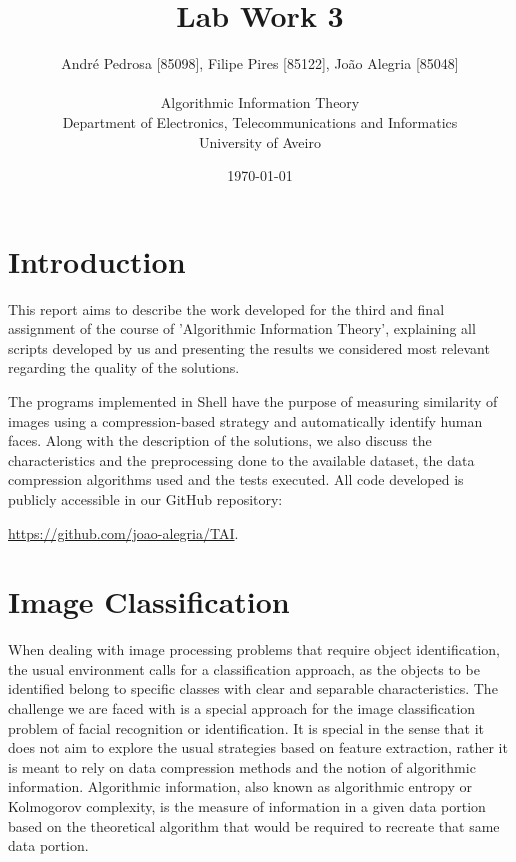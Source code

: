 \documentclass[12pt]{article}
\title{Lab Work 3}
\author
{André Pedrosa [85098], Filipe Pires [85122], João Alegria [85048]\\
\\
Algorithmic Information Theory\\
\normalsize{Department of Electronics, Telecommunications and Informatics}\\
\normalsize{University of Aveiro}\\
}
\date{\today{}}
\begin{document}
 

\baselineskip18pt

\maketitle 

\section{Introduction} %

This report aims to describe the work developed for the third and final assignment of the course of 'Algorithmic Information Theory', explaining all scripts
developed by us and presenting the results we considered most relevant regarding the quality of the solutions. 

The programs implemented in Shell have the purpose of measuring similarity of images using a compression-based strategy and automatically identify human faces.
Along with the description of the solutions, we also discuss the characteristics and the preprocessing done to the available dataset, the data compression 
algorithms used and the tests executed.
All code developed is publicly accessible in our GitHub repository: 

\url{https://github.com/joao-alegria/TAI}.
\newpage

\section{Image Classification} %

When dealing with image processing problems that require object identification, the usual environment calls for a classification approach, as the objects to 
be identified belong to specific classes with clear and separable characteristics.
The challenge we are faced with \cite{trab3} is a special approach for the image classification problem of facial recognition or identification.
It is special in the sense that it does not aim to explore the usual strategies based on feature extraction, rather it is meant to rely on data compression 
methods and the notion of algorithmic information.
Algorithmic information, also known as algorithmic entropy or Kolmogorov complexity, is the measure of information in a given data portion based on the 
theoretical algorithm that would be required to recreate that same data portion. 
\end{document}
